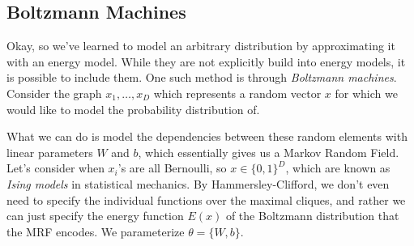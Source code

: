 \documentclass{article}
\begin{document}
\subsection{Boltzmann Machines}  

  Okay, so we've learned to model an arbitrary distribution by approximating it with an energy model. While they are not explicitly build into energy models, it is possible to include them. One such method is through \textit{Boltzmann machines}. Consider the graph $x_1, \ldots, x_D$ which represents a random vector $x$ for which we would like to model the probability distribution of. 
  \begin{center}
  \end{center}
  What we can do is model the dependencies between these random elements with linear parameters $W$ and $b$, which essentially gives us a Markov Random Field. Let's consider when $x_i$'s are all Bernoulli, so $x \in \{0, 1\}^D$, which are known as \textit{Ising models} in statistical mechanics. By Hammersley-Clifford, we don't even need to specify the individual functions over the maximal cliques, and rather we can just specify the energy function $E(x)$ of the Boltzmann distribution that the MRF encodes. We parameterize $\theta = \{W, b\}$. 
\end{document}
